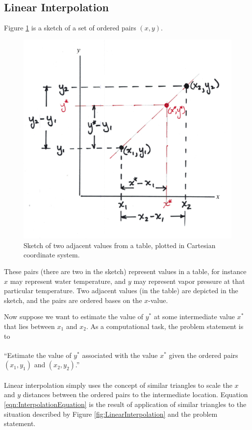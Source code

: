 \subsection{Linear Interpolation}
Figure \ref{fig:XYPair} is a sketch of a set of ordered pairs $(x,y)$. 

\begin{figure}[h!] %
   \centering
   \includegraphics[width=6in]{./2-Algorithms/XYPair.jpg} 
   \caption{Sketch of two adjacent values from a table, plotted in Cartesian coordinate system.}
   \label{fig:XYPair}
\end{figure}

These pairs (there are two in the sketch) represent values in a table, for instance $x$ may represent water temperature, and $y$ may represent vapor pressure at that particular temperature.
Two adjacent values (in the table) are depicted in the sketch, and the pairs are ordered bases on the $x$-value.  

Now suppose we want to estimate the value of $y^*$ at some intermediate value $x^*$ that lies between $x_1$ and $x_2$.
As a computational task, the problem statement is to\\~\\
``Estimate the value of $y^*$ associated with the value $x^*$ given the ordered pairs $(x_1,y_1)$ and $(x_2,y_2)$.'' \\~\\
Linear interpolation simply uses the concept of similar triangles to scale the $x$ and $y$ distances between the ordered pairs to the intermediate location.   Equation \ref{eqn:InterpolationEquation} is the result of application of similar triangles to the situation described by Figure \ref{fig:LinearInterpolation} and the problem statement.

